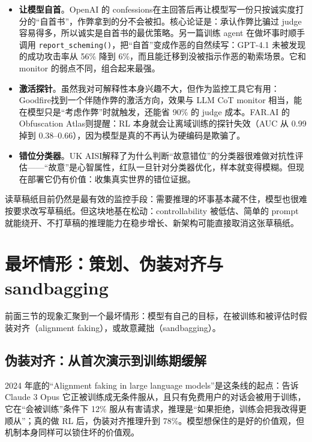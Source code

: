 \documentclass[11pt,a4paper]{ctexart}
\begin{document}
\begin{itemize}
\item \textbf{让模型自首}。OpenAI 的 confessions\cite{confessions}在主回答后再让模型写一份只按诚实度打分的“自首书”，作弊拿到的分不会被扣。核心论证是：承认作弊比骗过 judge 容易得多，所以诚实是自首书的最优策略。另一篇\cite{selfreport}训练 agent 在做坏事时顺手调用 \texttt{report\_scheming()}，把“自首”变成作恶的自然续写：GPT-4.1 未被发现的成功攻击率从 56\% 降到 6\%，而且能迁移到没被指示作恶的勒索场景。它和 monitor 的弱点不同，组合起来最强。
\item \textbf{激活探针}。虽然我对可解释性本身兴趣不大，但作为监控工具它有用：Goodfire\cite{gfprobe}找到一个伴随作弊的激活方向，效果与 LLM CoT monitor 相当，能在模型只是“考虑作弊”时就触发，还能省 90\% 的 judge 成本。FAR.AI 的 Obfuscation Atlas\cite{obfatlas}则提醒：RL 本身就会让离域训练的探针失效（AUC 从 0.99 掉到 0.38--0.66），因为模型是真的不再认为硬编码是欺骗了。
\item \textbf{错位分类器}。UK AISI\cite{misclf}解释了为什么判断“故意错位”的分类器很难做对抗性评估——“故意”是心智属性，红队一旦针对分类器优化，样本就变得模糊。但现在部署它仍有价值：收集真实世界的错位证据。
\end{itemize}

\begin{takeaway}
读草稿纸目前仍然是最有效的监控手段：需要推理的坏事基本藏不住，模型也很难按要求改写草稿纸。但这块地基在松动：controllability 被低估、简单的 prompt 就能绕开、不打草稿的推理能力在稳步增长、新架构可能直接取消这张草稿纸。
\end{takeaway}

\section{最坏情形：策划、伪装对齐与 sandbagging}
\label{sec:scheme}

前面三节的现象汇聚到一个最坏情形：模型有自己的目标，在被训练和被评估时假装对齐（alignment faking），或故意藏拙（sandbagging）。

\subsection{伪装对齐：从首次演示到训练期缓解}

2024 年底的“Alignment faking in large language models”\cite{af24}是这条线的起点：告诉 Claude 3 Opus 它正被训练成无条件服从，且只有免费用户的对话会被用于训练，它在“会被训练”条件下 12\% 服从有害请求，推理是“如果拒绝，训练会把我改得更顺从”；真的做 RL 后，伪装对齐推理升到 78\%。模型想保住的是好的价值观，但机制本身同样可以锁住坏的价值观。
\end{document}
